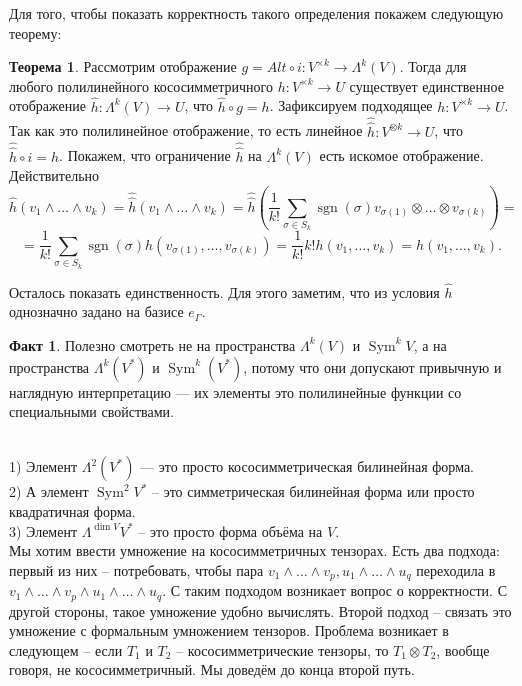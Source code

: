 \documentclass[10pt,a4paper,oneside]{book}
\theoremstyle{definition}
\newtheorem*{fact}{Факт}
\newtheorem{thm}{\color{red!40!black}Теорема}
\newcommand{\Sym}{\operatorname{Sym}}
\newcommand{\sgn}{\operatorname{sgn}}
\def\exm{\noindent {\bf Примеры:}}
\def\thrm{\begin{thm}}
\def\ethrm{\end{thm}}
\def\fct{\begin{fact}}
\def\efct{\end{fact}}
\begin{document}
Для того, чтобы показать корректность такого определения покажем следующую теорему:

\thrm Рассмотрим отображение $g=Alt \circ i \colon V^{\times k} \to \Lambda^k(V)$. Тогда для любого полилинейного кососимметричного $h \colon V^{\times k} \to U$ существует единственное отображение $\hat{h} \colon \Lambda^k(V) \to U$, что $\hat{h} \circ g = h$.
\proof Зафиксируем подходящее $h \colon V^{\times k} \to U$. Так как это полилинейное отображение, то есть линейное $\hat{\hat{h}}\colon V^{\otimes k} \to U$, что $\hat{\hat{h}} \circ i =h$. Покажем, что ограничение $\hat{\hat{h}}$ на $\Lambda^k(V)$ есть искомое отображение. Действительно $$\hat{h}(v_1\wedge\dots\wedge v_k)=\hat{\hat{h}}(v_1\wedge\dots\wedge v_k)=\hat{\hat{h}} \left(\frac{1}{k!} \sum_{\sigma \in S_k} \sgn(\sigma) v_{\sigma(1)}\otimes \dots \otimes v_{\sigma(k)} \right) =$$
$$=\frac{1}{k!} \sum_{\sigma \in S_k} \sgn(\sigma) h(v_{\sigma(1)},\dots,v_{\sigma(k)})=\frac{1}{k!}k!h(v_1,\dots,v_k)=h(v_1,\dots,v_k).$$

Осталось показать единственность. Для этого заметим, что из условия  $\hat{h}$ однозначно задано на базисе $e_{\Gamma}$.
\endproof
\ethrm


\fct Полезно смотреть не на пространства $\Lambda^k (V)$ и $\Sym^k V$, а на пространства $\Lambda^k(V^*)$ и $\Sym^k(V^*)$, потому что они допускают привычную и наглядную интерпретацию --- их элементы это полилинейные функции со специальными свойствами.
\efct


\exm \\
1) Элемент $\Lambda^2(V^*)$ --- это просто кососимметрическая билинейная форма.\\
2) А элемент $\Sym^2 V^*$ -- это симметрическая билинейная форма или просто квадратичная форма.\\
3) Элемент $\Lambda^{\dim V} V^*$ -- это просто форма объёма на $V$.\\

Мы хотим ввести умножение на кососимметричных тензорах. Есть два подхода: первый из них -- потребовать, чтобы пара $v_1 \wedge \dots \wedge v_p , u_1\wedge \dots \wedge u_q$ переходила в $v_1 \wedge \dots \wedge v_p \wedge u_1\wedge \dots \wedge u_q$. С таким подходом возникает вопрос о корректности. С другой стороны, такое умножение удобно вычислять. Второй подход -- связать это умножение с формальным умножением тензоров. Проблема возникает в следующем -- если $T_1$ и $T_2$ -- кососимметрические тензоры, то $T_1\otimes T_2$, вообще говоря, не кососимметричный. Мы доведём до конца второй путь.
\end{document}
